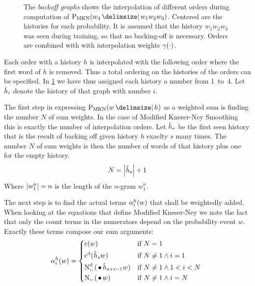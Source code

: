 \begin{figure}[tb]
  \centering
  
  \caption{
    The \emph{backoff graphs} shows the interpolation of different orders during
    computation of $\ProbMKN{w_4}{w_1 w_2 w_3}$.
    Centered are the histories for each probability.
    It is assumed that the history $w_1 w_2 w_3$ was seen during training, so
    that no backing-off is necessary.
    Orders are combined with with interpolation weights $\gamma(\cdot)$.
  }
  \label{fig:history-mkn}
\end{figure}

Each order with a history $h$ is interpolated with the following order where
the first word of $h$ is removed.
Thus a total ordering on the histories of the orders can be specified.
In \cref{fig:history-mkn} we have thus assigned each history a number from
$1$~to~$4$.
Let $\DerivedHistory[i]$ denote the history of that graph with number $i$.

The first step in expressing $\ProbMKN{w}{h}$ as a weighted sum is finding the
number $N$ of sum weights.
In the case of Modified Kneser-Ney Smoothing this is exactly the number of
interpolation orders.
Let $\DerivedHistory[s]$ be the first seen history that is the result of
backing off given history $h$ exaclty $s$ many times.
The number $N$ of sum weights is then the number of words of that history plus
one for the empty history.
\begin{equation}
  \label{eq:weightedsum-mkn-num}
  N = \NGramLength{\DerivedHistory[s]} + 1
\end{equation}
Where ${\left|w_1^n\right|} = n$ is the length of the $n$-gram $w_1^n$.

The next step is to find the actual terms $\alpha_i^h(w)$ that shall be
weightedly added.
When looking at the equations that define Modified Kneser-Ney we note the fact
that only the count terms in the numerators depend on the probability event $w$.
Exactly these terms compose our sum arguments:
\begin{equation}
  \SumArg_i^h(w) =
    \begin{dcases*}
      \Count(w)                                             & if $N = 1$ \\
      \DiscountedCount(\DerivedHistory[s] w)                & if $N \neq 1 \land i = 1$ \\
      \DiscountedCount*(\WSkp \DerivedHistory[s + i - 1] w) & if $N \neq 1 \land 1 < i < N$ \\
      \ContCountIp(\WSkp w)                                 & if $N \neq 1 \land i = N$
    \end{dcases*}
\end{equation}

